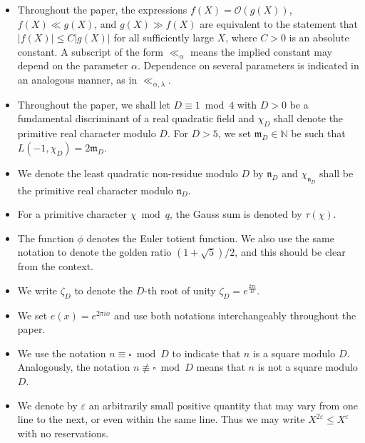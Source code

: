 \documentclass[11pt]{amsart}
\numberwithin{equation}{section}
\theoremstyle{remark}
\begin{document}
\begin{itemize}
    \item Throughout the paper, the expressions $f(X)=\mathcal{O}(g(X))$, $f(X) \ll g(X)$, and $g(X) \gg f(X)$ are equivalent to the statement that $|f(X)| \leq C|g(X)|$ for all sufficiently large $X$, where $C>0$ is an absolute constant. A subscript of the form $\ll_{\alpha}$ means the implied constant may depend on the parameter $\alpha$. Dependence on several parameters is indicated in an analogous manner, as in $\ll_{\alpha, \lambda}$.
    \item Throughout the paper, we shall let $D\equiv 1\bmod{4}$ with $D>0$ be a fundamental discriminant of a real quadratic field and $\chi_D$ shall denote the primitive real character modulo $D$. For $D>5$, we set $\mathfrak{m}_D \in \mathbb{N}$ be such that $L(-1,\chi_D)=2\mathfrak{m}_D$.
    \item We denote the least quadratic non-residue modulo $D$ by $\mathfrak{n}_D$ and $\chi_{\mathfrak{n}_D}$ shall be the primitive real character modulo $\mathfrak{n}_D$.
    \item For a primitive character $\chi \bmod q$, the Gauss sum is denoted by $\tau(\chi)$.
    \item The function $\phi$ denotes the Euler totient function. We also use the same notation to denote the golden ratio $(1+\sqrt{5})/2$, and this should be clear from the context.
    \item We write $\zeta_D$ to denote the $D$-th root of unity $\zeta_D = e^{\frac{2 \pi i }{D}}$.
    \item We set $e(x) = e^{2\pi i x}$ and use both notations interchangeably throughout the paper.
    \item We use the notation $n \equiv \square \bmod D$ to indicate that $n$ is a square modulo $D$. Analogously, the notation $n \not \equiv \square \bmod D$ means that $n$ is not a square modulo $D$.
    \item We denote by $\varepsilon$ an arbitrarily small positive quantity that may vary from one line to the next, or even within the same line. Thus we may write $X^{2 \varepsilon} \leq X^\varepsilon$ with no reservations.
    
\end{itemize}
\end{document}
